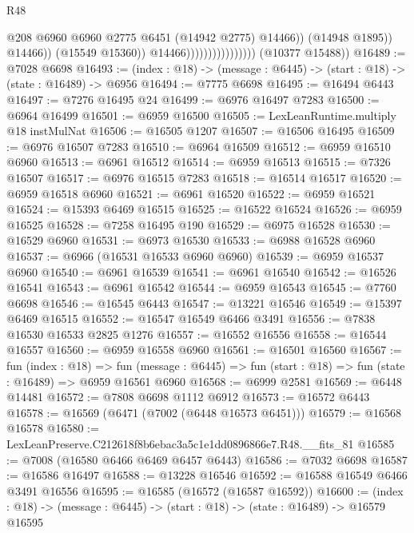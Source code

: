 \begin{lexlean}{R48}
\begin{coremodule}
                                                  @208
                                                  @6960
                                                  @6960
                                                  @2775
                                                  @6451
                                                  (@14942 @2775)
                                                  @14466))
                                              (@14948 @1895))
                                            @14466))
                                        (@15549 @15360))
                                      @14466))))))))))))))))
      (@10377 @15488))
@16489 := @7028 @6698
@16493 := (index : @18) -> (message : @6445) -> (start : @18) -> (state : @16489) -> @6956
@16494 := @7775 @6698
@16495 := @16494 @6443
@16497 := @7276 @16495 @24
@16499 := @6976 @16497 @7283
@16500 := @6964 @16499
@16501 := @6959 @16500
@16505 := LexLeanRuntime.multiply @18 instMulNat
@16506 := @16505 @1207
@16507 := @16506 @16495
@16509 := @6976 @16507 @7283
@16510 := @6964 @16509
@16512 := @6959 @16510 @6960
@16513 := @6961 @16512
@16514 := @6959 @16513
@16515 := @7326 @16507
@16517 := @6976 @16515 @7283
@16518 := @16514 @16517
@16520 := @6959 @16518 @6960
@16521 := @6961 @16520
@16522 := @6959 @16521
@16524 := @15393 @6469 @16515
@16525 := @16522 @16524
@16526 := @6959 @16525
@16528 := @7258 @16495 @190
@16529 := @6975 @16528
@16530 := @16529 @6960
@16531 := @6973 @16530
@16533 := @6988 @16528 @6960
@16537 := @6966 (@16531 @16533 @6960 @6960)
@16539 := @6959 @16537 @6960
@16540 := @6961 @16539
@16541 := @6961 @16540
@16542 := @16526 @16541
@16543 := @6961 @16542
@16544 := @6959 @16543
@16545 := @7760 @6698
@16546 := @16545 @6443
@16547 := @13221 @16546
@16549 := @15397 @6469 @16515
@16552 := @16547 @16549 @6466 @3491
@16556 := @7838 @16530 @16533 @2825 @1276
@16557 := @16552 @16556
@16558 := @16544 @16557
@16560 := @6959 @16558 @6960
@16561 := @16501 @16560
@16567 := fun (index : @18) =>
  fun (message : @6445) => fun (start : @18) => fun (state : @16489) => @6959 @16561 @6960
@16568 := @6999 @2581
@16569 := @6448 @14481
@16572 := @7808 @6698 @1112 @6912
@16573 := @16572 @6443
@16578 := @16569 (@6471 (@7002 (@6448 @16573 @6451)))
@16579 := @16568 @16578
@16580 := LexLeanPreserve.C212618f8b6ebac3a5c1e1dd0896866e7.R48.__fits_81
@16585 := @7008 (@16580 @6466 @6469 @6457 @6443)
@16586 := @7032 @6698
@16587 := @16586 @16497
@16588 := @13228 @16546
@16592 := @16588 @16549 @6466 @3491 @16556
@16595 := @16585 (@16572 (@16587 @16592))
@16600 := (index : @18) -> (message : @6445) -> (start : @18) -> (state : @16489) -> @16579 @16595

\end{coremodule}
\end{lexlean}
